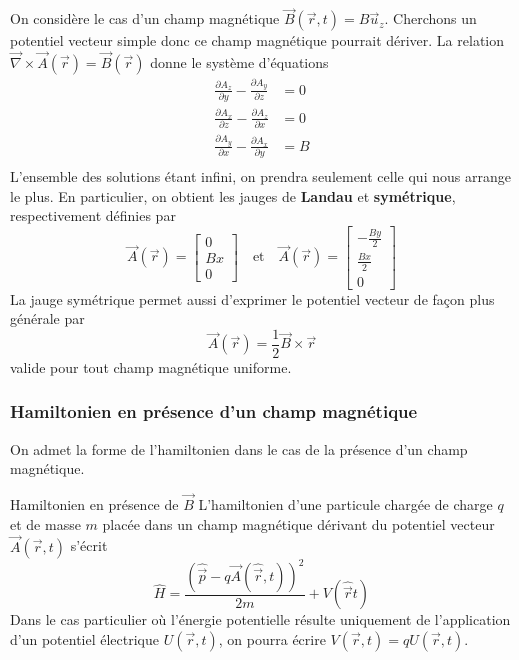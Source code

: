         On considère le cas d’un champ magnétique $\vec{B}(\vec{r},t) = B \vec{u}_z$. Cherchons un potentiel vecteur simple donc ce champ magnétique pourrait dériver. La relation $\vec{\nabla} \times \vec{A}(\vec{r}) = \vec{B}(\vec{r})$ donne le système d’équations 
        \begin{align*}
            \frac{\partial A_z}{\partial y} - \frac{\partial A_y}{\partial z} &= 0 \\ 
            \frac{\partial A_x}{\partial z} - \frac{\partial A_z}{\partial x} &= 0 \\  
            \frac{\partial A_y}{\partial x} - \frac{\partial A_x}{\partial y} &= B \\ 
        \end{align*}
        L’ensemble des solutions étant infini, on prendra seulement celle qui nous arrange le plus. En particulier, on obtient les jauges de \textbf{Landau} et \textbf{symétrique}, respectivement définies par 
        \[ \vec{A}(\vec{r}) = \begin{bmatrix}
            0 \\
            Bx \\
            0
        \end{bmatrix} \quad \text{et} \quad \vec{A}(\vec{r}) = \begin{bmatrix}
            - \frac{By}{2} \\
            \frac{Bx}{2} \\
            0
        \end{bmatrix}  \]
        La jauge symétrique permet aussi d’exprimer le potentiel vecteur de façon plus générale par 
        \[ \vec{A}(\vec{r}) = \frac{1}{2} \vec{B} \times \vec{r} \]   
        valide pour tout champ magnétique uniforme.

        \subsubsection{Hamiltonien en présence d’un champ magnétique}

        On admet la forme de l’hamiltonien dans le cas de la présence d’un champ magnétique. 

        \begin{omed}{Hamiltonien en présence de $\vec{B}$}
            L’hamiltonien d’une particule chargée de charge $q$ et de masse $m$ placée dans un champ magnétique dérivant du potentiel vecteur $\vec{A}(\vec{r},t)$ s’écrit 
            \[ \hat{H} = \frac{\left(\hat{\vec{p}} - q \vec{A}(\hat{\vec{r}},t)\right)^2}{2m} + V(\hat{\vec{r}}t) \]   
            Dans le cas particulier où l’énergie potentielle résulte uniquement de l’application d’un potentiel électrique $U(\vec{r},t)$, on pourra écrire $V(\vec{r},t) = q U(\vec{r},t)$.
        \end{omed}

